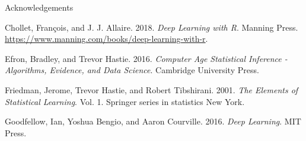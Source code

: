 \documentclass[10pt,ignorenonframetext,]{beamer}
\begin{document}
\begin{frame}{Acknowledgements}

\hypertarget{refs}{}
\hypertarget{ref-kerasR}{}
Chollet, François, and J. J. Allaire. 2018. \emph{Deep Learning with R}.
Manning Press. \url{https://www.manning.com/books/deep-learning-with-r}.

\hypertarget{ref-casi}{}
Efron, Bradley, and Trevor Hastie. 2016. \emph{Computer Age Statistical
Inference - Algorithms, Evidence, and Data Science}. Cambridge
University Press.

\hypertarget{ref-ESL}{}
Friedman, Jerome, Trevor Hastie, and Robert Tibshirani. 2001. \emph{The
Elements of Statistical Learning}. Vol. 1. Springer series in statistics
New York.

\hypertarget{ref-goodfellow}{}
Goodfellow, Ian, Yoshua Bengio, and Aaron Courville. 2016. \emph{Deep
Learning}. MIT Press.

\end{frame}
\end{document}
